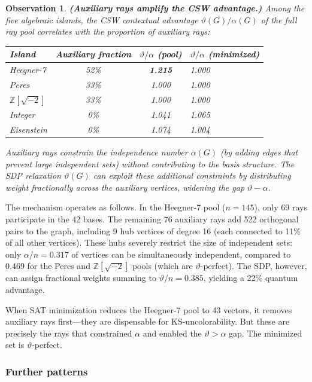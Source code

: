 \documentclass[12pt,a4paper]{article}
\newtheorem{observation}[theorem]{Observation}
\newcommand{\Z}{\mathbb{Z}}
\begin{document}
\begin{observation}\label{obs:auxiliary}
\textbf{(Auxiliary rays amplify the CSW advantage.)} Among the five algebraic islands, the CSW contextual advantage $\vartheta(G)/\alpha(G)$ of the full ray pool correlates with the proportion of auxiliary rays:
\begin{center}
\begin{tabular}{lccl}
\toprule
Island & Auxiliary fraction & $\vartheta/\alpha$ (pool) & $\vartheta/\alpha$ (minimized) \\
\midrule
Heegner-7 & 52\% & \textbf{1.215} & 1.000 \\
Peres & 33\% & 1.000 & 1.000 \\
$\Z[\sqrt{-2}]$ & 33\% & 1.000 & 1.000 \\
Integer & 0\% & 1.041 & 1.065 \\
Eisenstein & 0\% & 1.074 & 1.004 \\
\bottomrule
\end{tabular}
\end{center}
Auxiliary rays constrain the independence number $\alpha(G)$ (by adding edges that prevent large independent sets) without contributing to the basis structure. The SDP relaxation $\vartheta(G)$ can exploit these additional constraints by distributing weight fractionally across the auxiliary vertices, widening the gap $\vartheta - \alpha$.
\end{observation}

The mechanism operates as follows. In the Heegner-7 pool ($n = 145$), only 69 rays participate in the 42 bases. The remaining 76 auxiliary rays add 522 orthogonal pairs to the graph, including 9 hub vertices of degree 16 (each connected to 11\% of all other vertices). These hubs severely restrict the size of independent sets: only $\alpha/n = 0.317$ of vertices can be simultaneously independent, compared to $0.469$ for the Peres and $\Z[\sqrt{-2}]$ pools (which are $\vartheta$-perfect). The SDP, however, can assign fractional weights summing to $\vartheta/n = 0.385$, yielding a 22\% quantum advantage.

When SAT minimization reduces the Heegner-7 pool to 43 vectors, it removes auxiliary rays first---they are dispensable for KS-uncolorability. But these are precisely the rays that constrained $\alpha$ and enabled the $\vartheta > \alpha$ gap. The minimized set is $\vartheta$-perfect.

\subsubsection{Further patterns}
\end{document}
